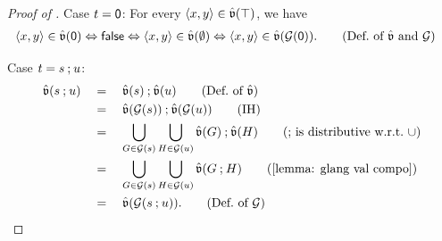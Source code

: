 \begin{proof}[Proof of ]
       Case $\term = \emp$:
       For every $\langle x, y\rangle \in \hat{\mathfrak{v}}(\top)$, we have
       \begin{align*}
              \tuple{x, y} \in \hat{\val}(\emp) & \Leftrightarrow \const{false}  \Leftrightarrow \tuple{x, y} \in \hat{\val}(\emptyset) \Leftrightarrow \tuple{x, y} \in \hat{\val}(\glang(\emp)). \tag{Def.\ of $\hat{\val}$ and $\glang$}
       \end{align*}

       Case $\term = \term[2] \compo \term[3]$:
       \begin{align*}
              \hat{\val}(\term[2] \compo \term[3]) & \quad=\quad \hat{\val}(\term[2]) \rcompo \hat{\val}(\term[3])  \tag{Def.\ of $\hat{\val}$}                                                                                                                     \\
                                                  & \quad=\quad \hat{\val}(\glang(\term[2])) \rcompo \hat{\val}(\glang(\term[3]))          \tag{IH}                                                                                                                \\
                                                  & \quad=\quad \bigcup_{\graph[1] \in \glang(\term[2])} \bigcup_{\graph[2] \in \glang(\term[3])} \hat{\val}(\graph[1]) \rcompo \hat{\val}(\graph[2])                 \tag{$\rcompo$ is distributive w.r.t.\ $\cup$} \\
                                                  & \quad=\quad \bigcup_{\graph[1] \in \glang(\term[2])} \bigcup_{\graph[2] \in \glang(\term[3])} \hat{\val}(\graph[1] \compo \graph[2]) \tag{\Cref{lemma: glang val compo}}                                      \\
                                                  & \quad=\quad \hat{\val}(\glang(\term[2] \compo \term[3])). \tag{Def.\ of $\glang$}
       \end{align*}


\end{proof}
